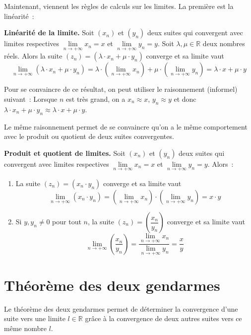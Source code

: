 Maintenant, viennent les règles de calculs sur les limites. La première est la linéarité~:

\begin{greybox}
\textbf{Linéarité de la limite.} Soit $(x_n)$ et $(y_n)$ deux suites qui convergent avec limites respectives $\lim \limits_{n \to +\infty}x_n = x$ et $\lim \limits_{n \to +\infty}y_n = y$. Soit $\lambda, \mu \in \mathbb R$ deux nombres réels. Alors la suite $(z_n) = (\lambda \cdot x_n + \mu \cdot y_n)$ converge et sa limite vaut 
$$\lim \limits_{n \to +\infty}(\lambda \cdot x_n + \mu \cdot y_n) = \lambda \cdot \left(\lim \limits_{n \to +\infty}x_n\right) + \mu \cdot \left( \lim \limits_{n \to +\infty}y_n \right) = \lambda \cdot x + \mu \cdot y$$
\end{greybox}

Pour se convaincre de ce résultat, on peut utiliser le raisonnement (informel) suivant~: Lorsque $n$ est très grand, on a $x_n \approx x$, $y_n \approx y$ et donc $\lambda \cdot x_n + \mu \cdot y_n \approx \lambda \cdot x + \mu \cdot y$.

Le même raisonnement permet de se convaincre qu'on a le même comportement avec le produit ou quotient de deux suites convergentes.
\begin{greybox}
\textbf{Produit et quotient de limites.} Soit $(x_n)$ et $(y_n)$ deux suites qui convergent avec limites respectives $\lim \limits_{n \to +\infty}x_n = x$ et $\lim \limits_{n \to +\infty}y_n = y$. Alors~:

\begin{enumerate}
    \item La suite $(z_n) = (x_n \cdot y_n)$ converge et sa limite vaut $$\lim \limits_{n \to +\infty}(x_n \cdot y_n) = \left(\lim \limits_{n \to +\infty} x_n\right) \cdot \left(\lim \limits_{n \to +\infty} y_n\right) = x \cdot y$$
    \item Si $y,y_n \neq 0$ pour tout $n$, la suite $(z_n) = \left(\dfrac{x_n}{y_n}\right)$ converge et sa limite vaut $$\lim \limits_{n \to +\infty}\left( \frac{x_n}{y_n} \right) = \frac{\lim \limits_{n \to +\infty} x_n}{\lim \limits_{n \to +\infty} y_n} = \frac{x}{y}$$
\end{enumerate}
\end{greybox}

\section{Théorème des deux gendarmes}

Le théorème des deux gendarmes permet de déterminer la convergence d'une suite vers une limite $l \in \mathbb R$ grâce à la convergence de deux autres suites vers ce même nombre $l$.


